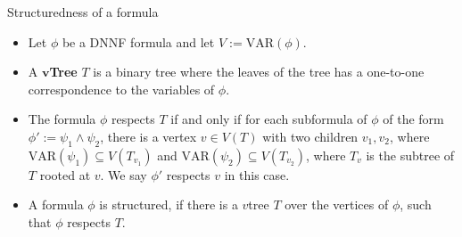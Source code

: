 \begin{frame}[t]{Structuredness of a formula}
	\begin{itemize}[<+->]
		\item Let $\phi$ be a DNNF formula and let $V := \mathrm{VAR}(\phi)$.
		\item A \textbf{$\mathbf{v}$Tree} $T$ is a binary tree where the leaves of the tree has a one-to-one correspondence to the variables of $\phi$.
		\item The formula $\phi$ respects $T$ if and only if for each subformula of  $\phi$ of the form $\phi' := \psi_1 \land \psi_2$, there is a vertex $v \in V(T)$ with two children $v_1, v_2$, where $\mathrm{VAR}(\psi_1)\subseteq V(T_{v_1})$ and $\mathrm{VAR}(\psi_2) \subseteq V(T_{v_2})$, where $T_v$ is the subtree of $T$ rooted at $v$. We say $\phi'$ respects $v$ in this case.
		\item A formula $\phi$ is structured, if there is a $v$tree $T$ over the vertices of $\phi$, such that $\phi$ respects $T$.
	\end{itemize}

\end{frame}

